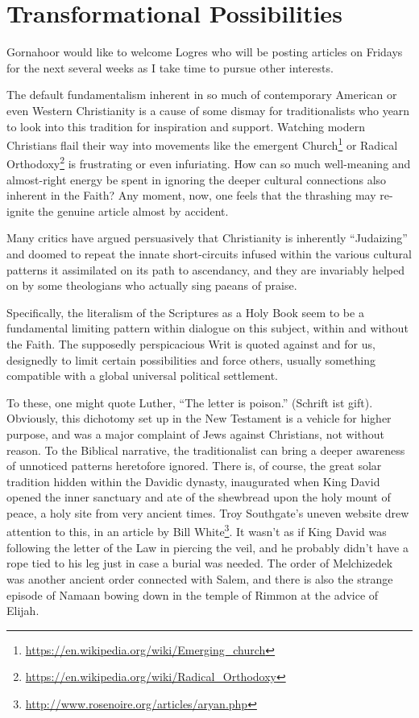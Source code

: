 \section{Transformational Possibilities}

\begin{quotex}
Gornahoor would like to welcome Logres who will be posting articles on Fridays for the next several weeks as I take time to pursue other interests. 
\end{quotex}

The default fundamentalism inherent in so much of contemporary American or even Western Christianity is a cause of some dismay for traditionalists who yearn to look into this tradition for inspiration and support. Watching modern Christians flail their way into movements like the emergent Church\footnote{\url{https://en.wikipedia.org/wiki/Emerging\_church}} or Radical Orthodoxy\footnote{\url{https://en.wikipedia.org/wiki/Radical\_Orthodoxy}} is frustrating or even infuriating. How can so much well-meaning and almost-right energy be spent in ignoring the deeper cultural connections also inherent in the Faith? Any moment, now, one feels that the thrashing may re-ignite the genuine article almost by accident.

Many critics have argued persuasively that Christianity is inherently ``Judaizing'' and doomed to repeat the innate short-circuits infused within the various cultural patterns it assimilated on its path to ascendancy, and they are invariably helped on by some theologians who actually sing paeans of praise.

Specifically, the literalism of the Scriptures as a Holy Book seem to be a fundamental limiting pattern within dialogue on this subject, within and without the Faith. The supposedly perspicacious Writ is quoted against and for us, designedly to limit certain possibilities and force others, usually something compatible with a global universal political settlement.

To these, one might quote Luther, ``The letter is poison.'' (Schrift ist gift). Obviously, this dichotomy set up in the New Testament is a vehicle for higher purpose, and was a major complaint of Jews against Christians, not without reason. To the Biblical narrative, the traditionalist can bring a deeper awareness of unnoticed patterns heretofore ignored. There is, of course, the great solar tradition hidden within the Davidic dynasty, inaugurated when King David opened the inner sanctuary and ate of the shewbread upon the holy mount of peace, a holy site from very ancient times. Troy Southgate's uneven website drew attention to this, in an article by Bill White\footnote{\url{http://www.rosenoire.org/articles/aryan.php}}. It wasn't as if King David was following the letter of the Law in piercing the veil, and he probably didn't have a rope tied to his leg just in case a burial was needed. The order of Melchizedek was another ancient order connected with Salem, and there is also the strange episode of Namaan bowing down in the temple of Rimmon at the advice of Elijah.

